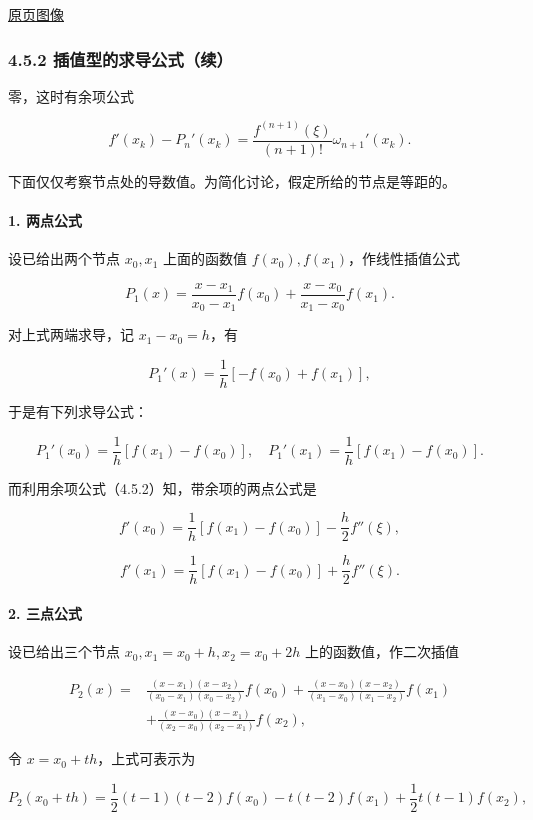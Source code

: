 \documentclass[
  10pt,
  fontset=fandol]{ctexart}
\begin{document}
\href{../../source-images/pdf-114.jpeg}{原页图像}

\subsubsection{4.5.2 插值型的求导公式（续）}\label{ux63d2ux503cux578bux7684ux6c42ux5bfcux516cux5f0fux7eed}

零，这时有余项公式

\[
f'(x_k)-P_n'(x_k)=\frac{f^{(n+1)}(\xi)}{(n+1)!}\omega_{n+1}'(x_k).
\tag{4.5.2}
\]

下面仅仅考察节点处的导数值。为简化讨论，假定所给的节点是等距的。

\paragraph{1. 两点公式}\label{ux4e24ux70b9ux516cux5f0f}

设已给出两个节点 \(x_0,x_1\) 上面的函数值 \(f(x_0),f(x_1)\)，作线性插值公式

\[
P_1(x)=\frac{x-x_1}{x_0-x_1}f(x_0)+\frac{x-x_0}{x_1-x_0}f(x_1).
\]

对上式两端求导，记 \(x_1-x_0=h\)，有

\[
P_1'(x)=\frac1h[-f(x_0)+f(x_1)],
\]

于是有下列求导公式：

\[
P_1'(x_0)=\frac1h[f(x_1)-f(x_0)],\quad
P_1'(x_1)=\frac1h[f(x_1)-f(x_0)].
\]

而利用余项公式（4.5.2）知，带余项的两点公式是

\[
f'(x_0)=\frac1h[f(x_1)-f(x_0)]-\frac h2f''(\xi),
\]

\[
f'(x_1)=\frac1h[f(x_1)-f(x_0)]+\frac h2f''(\xi).
\]

\paragraph{2. 三点公式}\label{ux4e09ux70b9ux516cux5f0f}

设已给出三个节点 \(x_0,x_1=x_0+h,x_2=x_0+2h\) 上的函数值，作二次插值

\[
\begin{aligned}
P_2(x)={}&\frac{(x-x_1)(x-x_2)}{(x_0-x_1)(x_0-x_2)}f(x_0)
+\frac{(x-x_0)(x-x_2)}{(x_1-x_0)(x_1-x_2)}f(x_1)\\
&+\frac{(x-x_0)(x-x_1)}{(x_2-x_0)(x_2-x_1)}f(x_2),
\end{aligned}
\]

令 \(x=x_0+th\)，上式可表示为

\[
P_2(x_0+th)=\frac12(t-1)(t-2)f(x_0)-t(t-2)f(x_1)
+\frac12t(t-1)f(x_2),
\]
\end{document}
